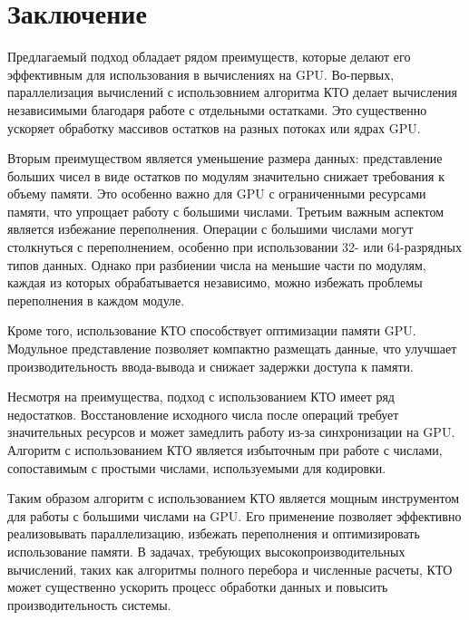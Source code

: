 \documentclass[10pt]{article}
\begin{document}
\section{Заключение}

Предлагаемый подход обладает рядом преимуществ, которые делают его эффективным для использования в вычислениях на GPU. Во-первых, параллелизация вычислений с использовнием алгоритма КТО делает вычисления независимыми благодаря работе с отдельными остатками. Это существенно ускоряет обработку массивов остатков на разных потоках или ядрах GPU.

Вторым преимуществом является уменьшение размера данных: представление больших чисел в виде остатков по модулям значительно снижает требования к объему памяти. Это особенно важно для GPU с ограниченными ресурсами памяти, что упрощает работу с большими числами. Третьим важным аспектом является избежание переполнения. Операции с большими числами могут столкнуться с переполнением, особенно при использовании 32- или 64-разрядных типов данных. Однако при разбиении числа на меньшие части по модулям, каждая из которых обрабатывается независимо, можно избежать проблемы переполнения в каждом модуле.

Кроме того, использование КТО способствует оптимизации памяти GPU. Модульное представление позволяет компактно размещать данные, что улучшает производительность ввода-вывода и снижает задержки доступа к памяти.

Несмотря на преимущества, подход с использованием КТО имеет ряд недостатков. Восстановление исходного числа после операций требует значительных ресурсов и может замедлить работу из-за синхронизации на GPU. Алгоритм с использованием КТО является избыточным при работе с числами, сопоставимым с простыми числами, используемыми для кодировки.

Таким образом алгоритм с использованием КТО является мощным инструментом для работы с большими числами на GPU. Его применение позволяет эффективно реализовывать параллелизацию, избежать переполнения и оптимизировать использование памяти. В задачах, требующих высокопроизводительных вычислений, таких как алгоритмы полного перебора и численные расчеты, КТО может существенно ускорить процесс обработки данных и повысить производительность системы.
\end{document}
